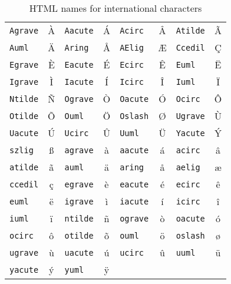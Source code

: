 \documentclass[12pt,letterpaper]{article}
\begin{document}
\begin{table}
\centering
\begin{tabular}[t]{|l|c||l|c||l|c||l|c|} \hline
\texttt{Agrave}   & \`A   &
\texttt{Aacute}   & \'A   &
\texttt{Acirc}    & \^A   &
\texttt{Atilde}   & \~A   \\
\texttt{Auml}     & \"{A} &
\texttt{Aring}    & \AA   &
\texttt{AElig}    & \AE   &
\texttt{Ccedil}   & \c{C} \\
\texttt{Egrave}   & \`E   &
\texttt{Eacute}   & \'E   &
\texttt{Ecirc}    & \^E   &
\texttt{Euml}     & \"{E} \\
\texttt{Igrave}   & \`I   &
\texttt{Iacute}   & \'I   &
\texttt{Icirc}    & \^I   &
\texttt{Iuml}     & \"{I} \\
\texttt{Ntilde}   & \~N   &
\texttt{Ograve}   & \`O   &
\texttt{Oacute}   & \'O   &
\texttt{Ocirc}    & \^O   \\
\texttt{Otilde}   & \~O   &
\texttt{Ouml}     & \"{O} &
\texttt{Oslash}   & \O    &
\texttt{Ugrave}   & \`U   \\
\texttt{Uacute}   & \'U   &
\texttt{Ucirc}    & \^U   &
\texttt{Uuml}     & \"{U} &
\texttt{Yacute}   & \'Y   \\
\texttt{szlig}    & \ss   &
\texttt{agrave}   & \`a   &
\texttt{aacute}   & \'a   &
\texttt{acirc}    & \^a   \\
\texttt{atilde}   & \~a   &
\texttt{auml}     & \"{a} &
\texttt{aring}    & \aa   &
\texttt{aelig}    & \ae   \\
\texttt{ccedil}   & \c{c} &
\texttt{egrave}   & \`e   &
\texttt{eacute}   & \'e   &
\texttt{ecirc}    & \^e   \\
\texttt{euml}     & \"{e} &
\texttt{igrave}   & \`i   &
\texttt{iacute}   & \'i   &
\texttt{icirc}    & \^i   \\
\texttt{iuml}     & \"{i} &
\texttt{ntilde}   & \~n   &
\texttt{ograve}   & \`o   &
\texttt{oacute}   & \'o   \\
\texttt{ocirc}    & \^o   &
\texttt{otilde}   & \~o   &
\texttt{ouml}     & \"{o} &
\texttt{oslash}   & \o    \\
\texttt{ugrave}   & \`u   &
\texttt{uacute}   & \'u   &
\texttt{ucirc}    & \^u   &
\texttt{uuml}     & \"{u} \\
\texttt{yacute}   & \'y   &
\texttt{yuml}     & \"{y} &&&&\\ \hline
\end{tabular}
\caption{HTML names for international characters}
\label{tab:HTMLchars}
\end{table}
\end{document}
